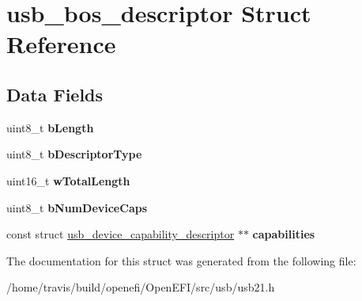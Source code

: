 \hypertarget{structusb__bos__descriptor}{}\section{usb\+\_\+bos\+\_\+descriptor Struct Reference}
\label{structusb__bos__descriptor}
\subsection*{Data Fields}
\begin{DoxyCompactItemize}
\item 
uint8\+\_\+t {\bfseries b\+Length}\hypertarget{structusb__bos__descriptor_aa3a661440a4b6d6a2ecf27da740c4121}{}\label{structusb__bos__descriptor_aa3a661440a4b6d6a2ecf27da740c4121}

\item 
uint8\+\_\+t {\bfseries b\+Descriptor\+Type}\hypertarget{structusb__bos__descriptor_afd74417a44821690051d50cd5ffdd581}{}\label{structusb__bos__descriptor_afd74417a44821690051d50cd5ffdd581}

\item 
uint16\+\_\+t {\bfseries w\+Total\+Length}\hypertarget{structusb__bos__descriptor_ab45b26a3249589469a53b2cfb99ddd1d}{}\label{structusb__bos__descriptor_ab45b26a3249589469a53b2cfb99ddd1d}

\item 
uint8\+\_\+t {\bfseries b\+Num\+Device\+Caps}\hypertarget{structusb__bos__descriptor_a2c0e68a49d6904d32413f3b3598bb926}{}\label{structusb__bos__descriptor_a2c0e68a49d6904d32413f3b3598bb926}

\item 
const struct \hyperlink{structusb__device__capability__descriptor}{usb\+\_\+device\+\_\+capability\+\_\+descriptor} $\ast$$\ast$ {\bfseries capabilities}\hypertarget{structusb__bos__descriptor_acaf102bddb6e6f6ef6d0d4d233061257}{}\label{structusb__bos__descriptor_acaf102bddb6e6f6ef6d0d4d233061257}

\end{DoxyCompactItemize}


The documentation for this struct was generated from the following file\+:\begin{DoxyCompactItemize}
\item 
/home/travis/build/openefi/\+Open\+E\+F\+I/src/usb/usb21.\+h\end{DoxyCompactItemize}
